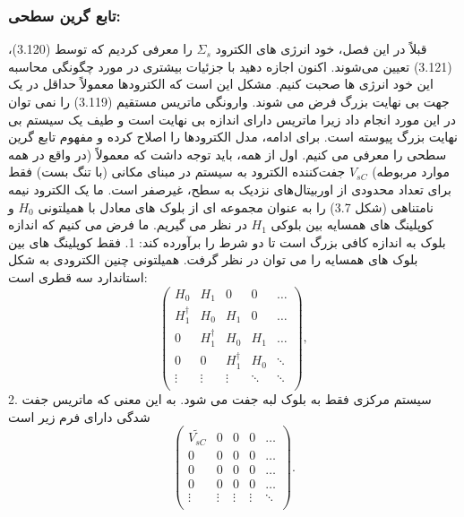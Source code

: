 \subsubsection*{تابع گرین سطحی:}
قبلاً در این فصل، خود انرژی های الکترود $\Sigma_{s}$ را معرفی کردیم که توسط (3.120)، (3.121) تعیین می‌شوند. اکنون اجازه دهید با جزئیات بیشتری در مورد چگونگی محاسبه این خود انرژی ها صحبت کنیم. مشکل این است که الکترودها معمولاً حداقل در یک جهت بی نهایت بزرگ فرض می شوند. وارونگی ماتریس مستقیم (3.119) را نمی توان در این مورد انجام داد زیرا ماتریس دارای اندازه بی نهایت است و طیف یک سیستم بی نهایت بزرگ پیوسته است.
برای ادامه، مدل الکترودها را اصلاح کرده و مفهوم تابع گرین سطحی را معرفی می کنیم. اول از همه، باید توجه داشت که معمولاً (در واقع در همه موارد مربوطه) $V_{sC}$ جفت‌کننده الکترود به سیستم در مبنای مکانی (با تنگ بست) فقط برای تعداد محدودی از اوربیتال‌های نزدیک به سطح، غیرصفر است. ما یک الکترود نیمه نامتناهی (شکل 3.7) را به عنوان مجموعه ای از بلوک های معادل با همیلتونی $H_0$ و کوپلینگ های همسایه بین بلوکی $H_1$ در نظر می گیریم. ما فرض می کنیم که اندازه بلوک به اندازه کافی بزرگ است تا دو شرط را برآورده کند:
1.	 فقط کوپلینگ های بین بلوک های همسایه را می توان در نظر گرفت. همیلتونی چنین الکترودی به شکل استاندارد سه قطری است:
\begin{equation}
    \left( \begin{matrix}
           {{H}_{0}} & {{H}_{1}} & 0 & 0 & \ldots   \\
           H_{1}^{\dagger } & {{H}_{0}} & {{H}_{1}} & 0 & \ldots   \\
           0 & H_{1}^{\dagger } & {{H}_{0}} & {{H}_{1}} & \ldots   \\
           0 & 0 & H_{1}^{\dagger } & {{H}_{0}} & \ddots   \\
           \vdots  & \vdots  & \vdots  & \ddots  & \ddots   \\
        \end{matrix} \right),
\end{equation}
2.	سیستم مرکزی فقط به بلوک لبه جفت می شود. به این معنی که ماتریس جفت شدگی دارای فرم زیر است
\begin{equation}
    \left( 
        \begin{matrix}
           \widetilde{{{V}_{sC}}} & 0 & 0 & 0 & \ldots   \\
           0 & 0 & 0 & 0 & \ldots   \\
           0 & 0 & 0 & 0 & \ldots   \\
           0 & 0 & 0 & 0 & \ldots   \\
           \vdots  & \vdots  & \vdots  & \vdots  & \ddots   \\
        \end{matrix} 
    \right).
\end{equation}
